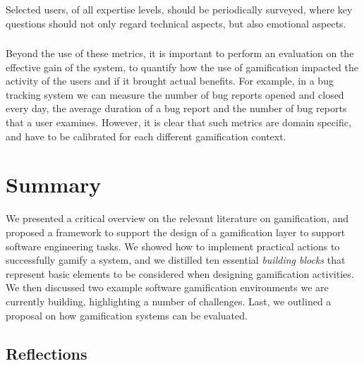 Selected users, of all expertise levels, should be periodically surveyed, where key questions should not only regard technical aspects, but also emotional aspects.


\subsubsection{}

Beyond the use of these metrics, it is important to perform an evaluation on the effective gain of the system, to quantify how the use of gamification impacted the activity of the users and if it brought actual benefits.
For example, in a bug tracking system we can measure the number of bug reports opened and closed every day, the average duration of a bug report and the number of bug reports that a user examines.
However, it is clear that such metrics are domain specific, and have to be calibrated for each different gamification context.


\section{Summary}\label{sec:gamification-summary}

We presented a critical overview on the relevant literature on gamification, and proposed a framework to support the design of a gamification layer to support software engineering tasks.
We showed how to implement practical actions to successfully gamify a system, and we distilled ten essential \emph{building blocks} that represent basic elements to be considered when designing gamification activities.
We then discussed two example software gamification environments we are currently building, highlighting a number of challenges.
Last, we outlined a proposal on how gamification systems can be evaluated.

\subsection{Reflections}

